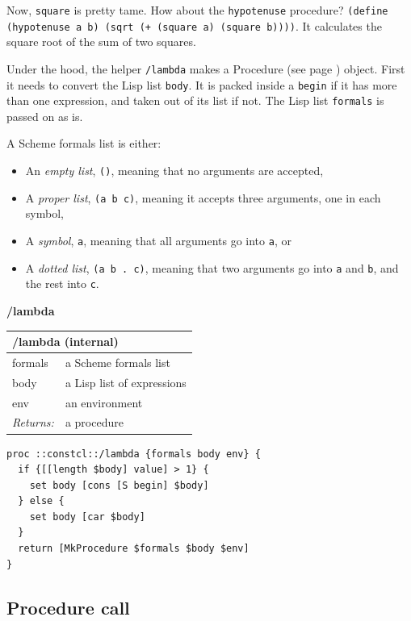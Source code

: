 \documentclass[twoside,9pt]{report}
\begin{document}
Now, \texttt{square} is pretty tame. How about the \texttt{hypotenuse} procedure? \texttt{(define (hypotenuse a b) (sqrt (+ (square a) (square b))))}. It calculates the square root of the sum of two squares.


Under the hood, the helper \texttt{/lambda} makes a Procedure (see page \pageref{control}) object. First it needs to convert the Lisp list \texttt{body}. It is packed inside a \texttt{begin} if it has more than one expression, and taken out of its list if not. The Lisp list \texttt{formals} is passed on as is.


A Scheme formals list is either:

\begin{itemize}
\item An \emph{empty list}, \texttt{()}, meaning that no arguments are accepted,
\item A \emph{proper list}, \texttt{(a b c)}, meaning it accepts three arguments, one in each symbol,
\item A \emph{symbol}, \texttt{a}, meaning that all arguments go into \texttt{a}, or
\item A \emph{dotted list}, \texttt{(a b . c)}, meaning that two arguments go into \texttt{a} and \texttt{b}, and the rest into \texttt{c}.
\end{itemize}

\textbf{/lambda}

\begin{tabular}{ |l l| }
\hline
\multicolumn{2}{|l|}{/lambda (internal)} \\
\hline
formals & a Scheme formals list \\
body & a Lisp list of expressions \\
env & an environment \\
\textit{Returns:} & a procedure \\
\hline
\end{tabular}

\noindent\makebox[\linewidth]{\rule{\linewidth}{0.4pt}}
\begin{lstlisting}
proc ::constcl::/lambda {formals body env} {
  if {[[length $body] value] > 1} {
    set body [cons [S begin] $body]
  } else {
    set body [car $body]
  }
  return [MkProcedure $formals $body $env]
}
\end{lstlisting}
\noindent\makebox[\linewidth]{\rule{\linewidth}{0.4pt}}
\subsection{Procedure call}
\label{procedure-call}
\end{document}
